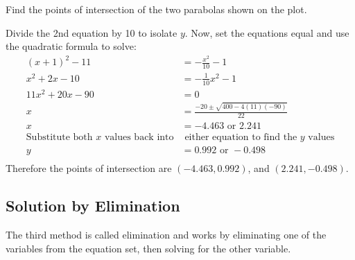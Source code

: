  \examq Find the points of intersection of the two parabolas shown on the plot.
 \begin{center}
 \end{center}
 \solution Divide the 2nd equation by 10 to isolate $y$. Now, set the equations equal and use the quadratic formula to solve:
 \begin{align*}
 (x+1)^2-11&=-\frac{x^2}{10}-1\tag{set eq1=eq2}\\
 x^2+2x-10&=-\frac{1}{10}x^2-1\tag{expand the brackets}\\
 11x^2+20x-90&=0\tag{collect like terms}\\
 x&=\frac{-20\pm\sqrt{400-4(11)(-90)}}{22}\\
 x&=-4.463 \mbox{ or }2.241\\
 \text{Substitute both }x\text{ values back into}& \text{ either equation to find the }y\text{ values}\\
 y&=0.992 \mbox{ or } -0.498\\
 \end{align*}
 Therefore the points of intersection are $(-4.463,0.992)$, and $(2.241,-0.498)$.
 
\subsection*{Solution by Elimination} 
The third method is called elimination and works by eliminating one of the variables from the equation set, then solving for the other variable.

